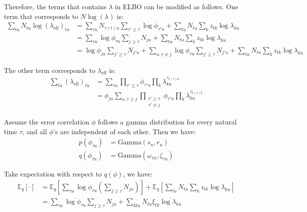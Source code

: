\documentclass[11pt]{article}
\begin{document}
Therefore, the terms that contains $\lambda$ in ELBO can be modified as follows. One term that corresponds to $N\log(\lambda_{\mathrm{}})$ is:
\begin{align*}
    \sum_{tu} N_{tu} \log(\lambda_{\mathrm{eff}})_{tu}
    &= \sum_{\tau u} N_{\tau(t) u} \sum_{\tau' \le \tau} \log\phi_{\tau' u} + \sum_{tu} N_{tu} \sum_k z_{tk} \log\lambda_{ku} \\
    &= \sum_{\tau u} \log\phi_{\tau u} \sum_{j \ge \tau}N_{ju} + \sum_{tu} N_{tu} \sum_k z_{tk} \log\lambda_{ku} \\
    &= \log\phi_{ju} \sum_{j' \ge \tau}N_{j'u} + \sum_{u, \tau \ne j} \log\phi_{\tau u} \sum_{j' \ge \tau}N_{j'u} + \sum_{tu} N_{tu} \sum_k z_{tk} \log\lambda_{ku}
\end{align*}

The other term corresponds to $\lambda_{\mathrm{eff}}$ is:
\begin{align}
    \sum_{tu}(\lambda_{\mathrm{eff}})_{tu} &= \sum_{\tau u} \prod_{\tau' \le \tau} \phi_{\tau' u} \prod_k \lambda_{ku}^{z_{t(\tau)k}} \\
    &= \phi_{ju} \sum_{u, \tau \ge j} \prod_{\substack{\tau' \ge \tau \\ \tau' \ne j}} \phi_{\tau'u} \prod_k \lambda_{ku}^{z_{t(\tau)k}}
\end{align}

Assume the error correlation $\phi$ follows a gamma distribution for every natural time $\tau$, and all $\phi$'s are independent of each other. Then we have:
\begin{align}
    p(\phi_{\tau u}) &= \mathrm{Gamma}(s_u, r_u) \\
    q(\phi_{\tau u}) &= \mathrm{Gamma}(\omega_{\tau u}, \zeta_{\tau u})
\end{align}

Take expectation with respect to $q(\phi)$, we have:
\begin{align}
    \mathbb{E}_{q}[\cdot] &= \mathbb{E}_{q} \left[\sum_{\tau u} \log\phi_{\tau u} (\sum_{j \ge \tau}N_{ju}) \right]
    + \mathbb{E}_{q}\left[\sum_{tu} N_{tu} \sum_k z_{tk} \log\lambda_{ku} \right] \\
    &= \sum_{\tau u}\overline{\log\phi_{\tau u}} \sum_{j \ge \tau}N_{ju} + \sum_{ktu} N_{tu}\xi_{tk} \overline{\log \lambda_{ku}}
\end{align}
\end{document}
